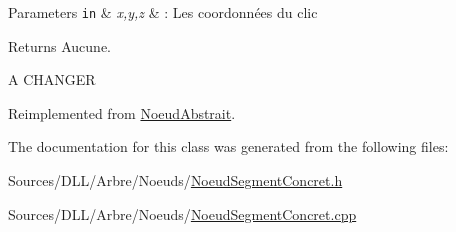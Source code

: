 \begin{DoxyParams}[1]{Parameters}
\mbox{\tt in}  & {\em x,y,z} & \+: Les coordonnées du clic\\
\hline
\end{DoxyParams}
\begin{DoxyReturn}{Returns}
Aucune. 
\end{DoxyReturn}
A C\+H\+A\+N\+G\+E\+R 

Reimplemented from \hyperlink{group__inf2990_gad1d1a9c6adcedfcd5eda6c6d4e67a50f}{Noeud\+Abstrait}.



The documentation for this class was generated from the following files\+:\begin{DoxyCompactItemize}
\item 
Sources/\+D\+L\+L/\+Arbre/\+Noeuds/\hyperlink{_noeud_segment_concret_8h}{Noeud\+Segment\+Concret.\+h}\item 
Sources/\+D\+L\+L/\+Arbre/\+Noeuds/\hyperlink{_noeud_segment_concret_8cpp}{Noeud\+Segment\+Concret.\+cpp}\end{DoxyCompactItemize}
